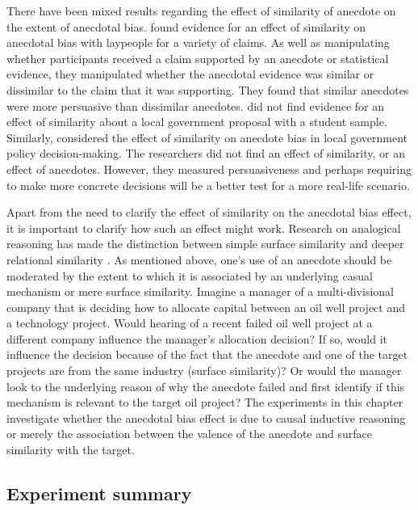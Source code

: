 \documentclass[a4paper, nobind, dvipsnames]{templates/ociamthesis}
\theoremstyle{definition}
\theoremstyle{definition}
\theoremstyle{definition}
\theoremstyle{definition}
\theoremstyle{remark}
\begin{document}
There have been mixed results regarding the effect of similarity of anecdote on
the extent of anecdotal bias. \textcite[Study 3]{hoeken2009} found evidence for an effect
of similarity on anecdotal bias with laypeople for a variety of claims. As well
as manipulating whether participants received a claim supported by an anecdote
or statistical evidence, they manipulated whether the anecdotal evidence was
similar or dissimilar to the claim that it was supporting. They found that
similar anecdotes were more persuasive than dissimilar anecdotes. \textcite{hoeken2001}
did not find evidence for an effect of similarity about a local government
proposal with a student sample. Similarly, \textcite{hornikx2018} considered the effect of
similarity on anecdote bias in local government policy decision-making. The
researchers did not find an effect of similarity, or an effect of anecdotes.
However, they measured persuasiveness and perhaps requiring to make more
concrete decisions will be a better test for a more real-life scenario.

Apart from the need to clarify the effect of similarity on the anecdotal bias
effect, it is important to clarify how such an effect might work. Research on
analogical reasoning has made the distinction between simple surface similarity
and deeper relational similarity \autocite{gentner1983}. As mentioned above, one's use
of an anecdote should be moderated by the extent to which it is associated by an
underlying casual mechanism or mere surface similarity. Imagine a manager of a
multi-divisional company that is deciding how to allocate capital between an oil
well project and a technology project. Would hearing of a recent failed oil well
project at a different company influence the manager's allocation decision? If
so, would it influence the decision because of the fact that the anecdote and
one of the target projects are from the same industry (surface similarity)? Or
would the manager look to the underlying reason of why the anecdote failed and
first identify if this mechanism is relevant to the target oil project? The
experiments in this chapter investigate whether the anecdotal bias effect is due
to causal inductive reasoning or merely the association between the valence of
the anecdote and surface similarity with the target.

\hypertarget{experiment-summary-1}{%
\subsection{Experiment summary}\label{experiment-summary-1}}
\end{document}
